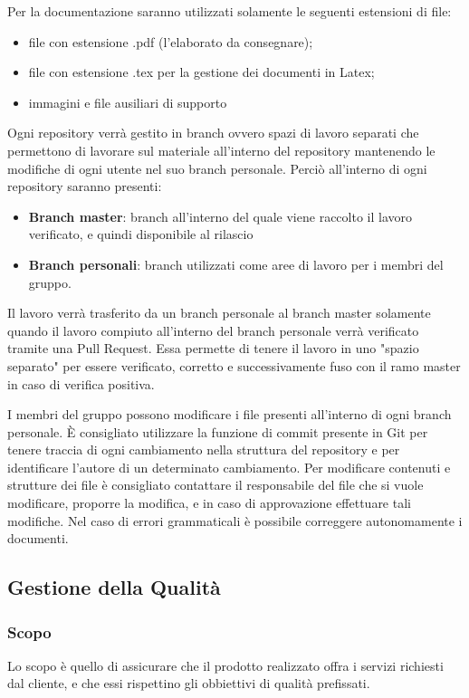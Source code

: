 			Per la documentazione saranno utilizzati solamente le seguenti estensioni di file:
			\begin{itemize}
				\item file con estensione .pdf (l'elaborato da consegnare);
				\item file con estensione .tex per la gestione dei documenti in Latex;
				\item immagini e file ausiliari di supporto
			\end{itemize}
		
			Ogni repository verrà gestito in branch ovvero spazi di lavoro separati che permettono di lavorare sul materiale all'interno del repository mantenendo le modifiche di ogni utente nel suo branch personale. Perciò all'interno di ogni repository saranno presenti:
			\begin{itemize}
				\item \textbf{Branch master}: branch all'interno del quale viene raccolto il lavoro verificato, e quindi disponibile al rilascio
				\item \textbf{Branch personali}: branch utilizzati come aree di lavoro per i membri del gruppo.
			\end{itemize}
			Il lavoro verrà trasferito da un branch personale al branch master solamente quando il lavoro compiuto all'interno del branch personale verrà verificato tramite una Pull Request. Essa permette di tenere il lavoro in uno "spazio separato" per essere verificato, corretto e successivamente fuso con il ramo master in caso di verifica positiva.
			
			I membri del gruppo possono modificare i file presenti all'interno di ogni branch personale. È consigliato utilizzare la funzione di commit presente in Git per tenere traccia di ogni cambiamento nella struttura del repository e per identificare l'autore di un determinato cambiamento. Per modificare contenuti e strutture dei file è consigliato contattare il responsabile del file che si vuole modificare, proporre la modifica, e in caso di approvazione effettuare tali modifiche. Nel caso di errori grammaticali è possibile correggere autonomamente i documenti. 
	
	\subsection{Gestione della Qualità}
		\subsubsection{Scopo}
		Lo scopo è quello di assicurare che il prodotto realizzato offra i servizi richiesti dal cliente, e che essi rispettino gli obbiettivi di qualità prefissati.
		
